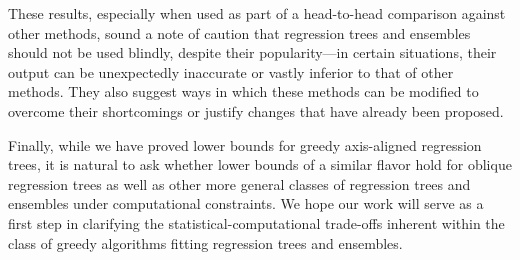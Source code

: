 \documentclass[11pt]{article}
\newcommand{\jk}[1]{{\color{orange}[JK: #1]}}
\newcommand{\kb}[1]{{\color{purple}[KB: #1]}}
\begin{document}
These results, especially when used as part of a head-to-head comparison against other methods, sound a note of caution that regression trees and ensembles should not be used blindly, despite their popularity---in certain situations, their output can be unexpectedly inaccurate or vastly inferior to that of other methods.
They also suggest ways in which these methods can be modified to overcome their shortcomings or justify changes that have already been proposed. 

Finally, while we have proved lower bounds for greedy axis-aligned regression trees, it is natural to ask whether lower bounds of a similar flavor hold for oblique regression trees as well as other more general classes of regression trees and ensembles under computational constraints.
We hope our work will serve as a first step in clarifying the statistical-computational trade-offs inherent within the class of greedy algorithms fitting regression trees and ensembles.


\end{document}
